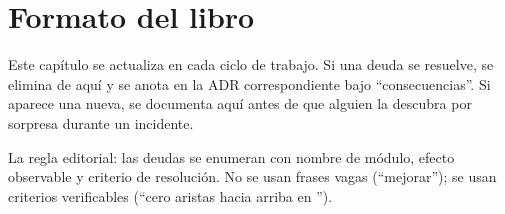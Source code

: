 \section{Formato del libro}

Este capítulo se actualiza en cada ciclo de trabajo. Si una deuda
se resuelve, se elimina de aquí y se anota en la ADR correspondiente
bajo ``consecuencias''. Si aparece una nueva, se documenta aquí
antes de que alguien la descubra por sorpresa durante un incidente.

La regla editorial: las deudas se enumeran con nombre de módulo,
efecto observable y criterio de resolución. No se usan frases
vagas (``mejorar''); se usan criterios verificables (``cero
aristas hacia arriba en '').
